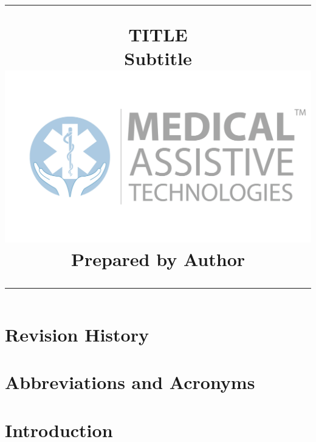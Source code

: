 \documentclass[11pt]{article}
\title{%
\flushright
\rule{16cm}{5pt}
\Huge{TITLE}\\
\vspace{1cm}
Subtitle\\
\vspace{2cm}
\vspace{2cm}
\includegraphics[scale=0.2, keepaspectratio=true]{images/MAT.jpg}
\vfill
Prepared by Author\\
\rule{16cm}{5pt}
\date{}
}
\begin{document}
\clearpage\maketitle
\thispagestyle{empty}
\newpage
\setcounter{page}{1}
\setcounter{secnumdepth}{0}
\setcounter{tocdepth}{5}
\tableofcontents

\newpage
\section{Revision History}


\newpage
\section{Abbreviations and Acronyms}

\setcounter{secnumdepth}{5}

\newpage\setcounter{page}{1}

\section{Introduction}
\label{sec:introduction}
\end{document}
